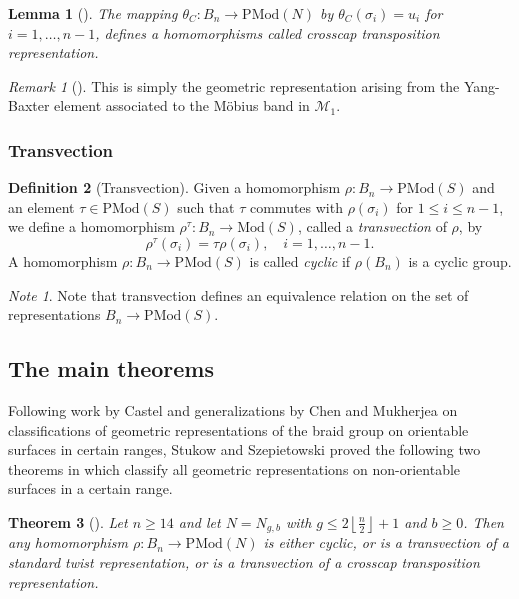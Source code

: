 \documentclass[reqno]{amsart}
\newtheorem{theorem}{Theorem}[section]
\newtheorem{lemma}[theorem]{Lemma}
\theoremstyle{definition}
\newtheorem{definition}[theorem]{Definition}
\theoremstyle{remark}
\newtheorem*{remark}{Remark}
\newtheorem*{note}{Note}
\newcommand{\Mod}{{\mathrm{Mod}}}
\newcommand{\PMod}{{\mathrm{PMod}}}
\begin{document}
\begin{lemma}[]
    The mapping $\theta_{C} \colon B_n \to \PMod (N)$ by
    $\theta_C \left( \sigma_i \right) =u_i$ for
    $i = 1,\ldots, n-1$, defines a homomorphisms
    called crosscap transposition representation.
\end{lemma}

\begin{remark}[]
    This is simply the geometric representation
    arising from the Yang-Baxter element associated to
    the Möbius band in $\mathcal{M}_1$.
\end{remark}


\subsubsection{Transvection}

\begin{definition}[Transvection]
    Given a homomorphism
    $\rho \colon B_n \to \PMod (S)$ and an element
    $\tau \in \PMod (S)$ such that
    $\tau$ commutes with $\rho\left( \sigma_i \right) $ 
    for $1 \le i \le n-1$, we define a homomorphism
    $\rho^{\tau} \colon B_n \to \Mod (S)$, called
    a \textit{transvection} of $\rho$, by
    \[
        \rho^{\tau} \left( \sigma_i \right) 
        = \tau \rho \left( \sigma_i \right) , \quad
        i = 1,\ldots, n-1.
    \] 
    A homomorphism $\rho \colon B_n \to \PMod (S)$ is called
    \textit{cyclic} if $\rho \left( B_n \right) $ is a 
    cyclic group. 
\end{definition}

\begin{note}
    Note that transvection defines an
    equivalence relation on
    the set of representations
    $B_n \to \PMod(S)$.
\end{note}


\subsection{The main theorems}

Following work by Castel and generalizations by
Chen and Mukherjea on classifications
of geometric representations of the braid
group on orientable surfaces in certain ranges,
Stukow and Szepietowski
proved the following two theorems in \cite{StSz} which classify
all geometric representations on non-orientable surfaces
in a certain range. 

\begin{theorem}[]\label{Thm1.2}
    Let $n \ge 14$ and let $N = N_{g,b}$ with
    $g \le 2 \left\lfloor \frac{n}{2} \right\rfloor +1$ and
    $b\ge 0$. Then any homomorphism
    $\rho \colon B_n \to \PMod (N)$ is either
    cyclic, or is a transvection of a standard twist
    representation, or is a transvection of a crosscap
    transposition representation.
\end{theorem}
\end{document}
